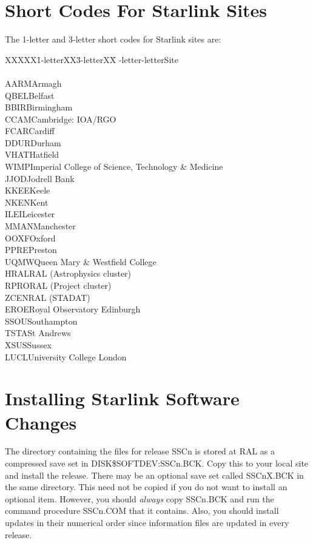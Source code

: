 \newpage

\section {Short Codes For Starlink Sites}

The 1-letter and 3-letter short codes for Starlink sites are:
\begin{tabbing}
XXXXX\=1-letterXX\=3-letterXX\=\kill
{}-letter-letter\>Site\\
\\  
\>A\>ARM\>Armagh\\
\>Q\>BEL\>Belfast\\
\>B\>BIR\>Birmingham\\
\>C\>CAM\>Cambridge: IOA/RGO\\
\>F\>CAR\>Cardiff\\
\>D\>DUR\>Durham\\
\>V\>HAT\>Hatfield\\
\>W\>IMP\>Imperial College of Science, Technology \& Medicine\\
\>J\>JOD\>Jodrell Bank\\
\>K\>KEE\>Keele\\
\>N\>KEN\>Kent\\
\>I\>LEI\>Leicester\\
\>M\>MAN\>Manchester\\
\>O\>OXF\>Oxford\\
\>P\>PRE\>Preston\\
\>U\>QMW\>Queen Mary \& Westfield College\\
\>H\>RAL\>RAL (Astrophysics cluster)\\
\>R\>PRO\>RAL (Project cluster)\\
\>Z\>CEN\>RAL (STADAT)\\
\>E\>ROE\>Royal Observatory Edinburgh\\
\>S\>SOU\>Southampton\\
\>T\>STA\>St Andrews\\
\>X\>SUS\>Sussex\\
\>L\>UCL\>University College London\\
\end{tabbing}

\newpage

\section{Installing Starlink Software Changes}

The directory containing the files for release SSCn is stored at RAL as a
compressed save set in DISK\$SOFTDEV:\-SSCn.\-BCK.
Copy this to your local site and install the release.
There may be an optional save set called SSCnX.BCK in the same directory.
This need not be copied if you do not want to install an optional item.
However, you should {\em always} copy SSCn.BCK and run the command procedure
SSCn.COM that it contains.
Also, you should install updates in their numerical order since information
files are updated in every release.

